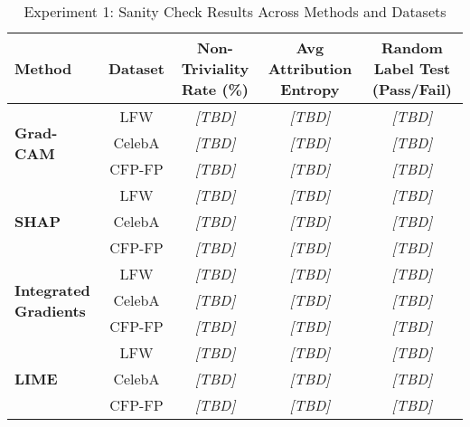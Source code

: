 
\begin{table}[htbp]
\centering
\caption{Experiment 1: Sanity Check Results Across Methods and Datasets}
\label{tab:sanity_check_results}
\small
\begin{tabularx}{\textwidth}{lcccc}
\toprule
\textbf{Method} & \textbf{Dataset} & \textbf{Non-Triviality Rate (\%)} & \textbf{Avg Attribution Entropy} & \textbf{Random Label Test (Pass/Fail)} \\
\midrule
\multirow{3}{*}{\textbf{Grad-CAM}} & LFW & \textit{[TBD]} & \textit{[TBD]} & \textit{[TBD]} \\
& CelebA & \textit{[TBD]} & \textit{[TBD]} & \textit{[TBD]} \\
& CFP-FP & \textit{[TBD]} & \textit{[TBD]} & \textit{[TBD]} \\[4pt]

\multirow{3}{*}{\textbf{SHAP}} & LFW & \textit{[TBD]} & \textit{[TBD]} & \textit{[TBD]} \\
& CelebA & \textit{[TBD]} & \textit{[TBD]} & \textit{[TBD]} \\
& CFP-FP & \textit{[TBD]} & \textit{[TBD]} & \textit{[TBD]} \\[4pt]

\multirow{3}{*}{\textbf{Integrated Gradients}} & LFW & \textit{[TBD]} & \textit{[TBD]} & \textit{[TBD]} \\
& CelebA & \textit{[TBD]} & \textit{[TBD]} & \textit{[TBD]} \\
& CFP-FP & \textit{[TBD]} & \textit{[TBD]} & \textit{[TBD]} \\[4pt]

\multirow{3}{*}{\textbf{LIME}} & LFW & \textit{[TBD]} & \textit{[TBD]} & \textit{[TBD]} \\
& CelebA & \textit{[TBD]} & \textit{[TBD]} & \textit{[TBD]} \\
& CFP-FP & \textit{[TBD]} & \textit{[TBD]} & \textit{[TBD]} \\

\bottomrule
\end{tabularx}
\end{table}


